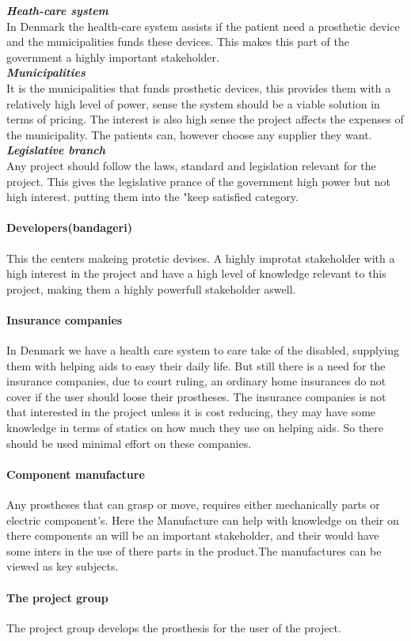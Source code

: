 \noindent\textbf{\textit{Heath-care system}}\\ 
In Denmark the health-care system assists if the patient need a prosthetic device and the municipalities funds these devices. This makes this part of the government a highly important stakeholder. \\

\noindent\textbf{\textit{Municipalities}}\\
It is the municipalities that funds prosthetic devices, this provides them with a relatively high level of power, sense the system should be a viable solution in terms of pricing. The interest is also high sense the project affects the expenses of the municipality. The patients can, however choose any supplier they want.\\ 

\noindent\textbf{\textit{Legislative branch}}\\  Any project should follow the laws, standard and legislation relevant for the project. This gives the legislative prance of the government high power but not high interest. putting them into the "keep satisfied category. 
\paragraph{Developers(bandageri)}\label{st:Bandageri}
This the centers makeing protetic devises. A highly improtat stakeholder with a high interest in the project and have a high level of knowledge relevant to this project, making them a highly powerfull stakeholder aswell. 
\paragraph{Insurance companies}\label{st:InsuranceCompanies}
In Denmark we have a health care system to care take of the disabled, supplying them with helping aids to easy their daily life. But still there is a need for the insurance companies, due to court ruling, an ordinary home insurances do not cover if the user should loose their prostheses. The insurance companies is not that interested in the project unless it is cost reducing, they may have some knowledge in terms of statics on how much they use on helping aids. So there should be used minimal effort on these companies.
\paragraph{Component manufacture}\label{st:ComponentManufacture}
Any prostheses that can grasp or move, requires either mechanically parts or electric component's. Here the Manufacture can help with knowledge on their on there components an will be an important stakeholder, and their would have some inters in the use of there parts in the product.The manufactures can be viewed as key subjects.

\paragraph{The project group}\label{st:ProjectGroup}
The project group develops the prosthesis for the user of the project. 
